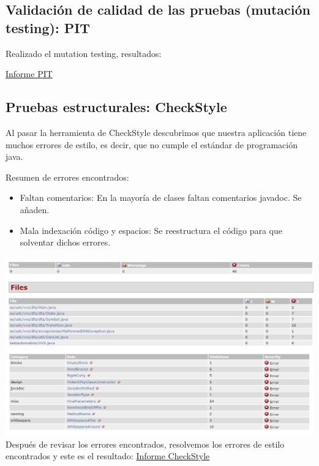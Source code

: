 \documentclass[DIV=calc,paper=a4,fontsize=11pt,onecolumn]{scrartcl} %
\begin{document}
	\subsection{Validación de calidad de las pruebas (mutación testing): PIT}
	Realizado el mutation testing, resultados:
	
	\href{Informes/pit-reports/index.html}{Informe PIT} \\
	
	\subsection{Pruebas estructurales: CheckStyle}
	Al pasar la herramienta de CheckStyle descubrimos que nuestra aplicación tiene muchos errores de estilo, es decir, que no cumple el estándar de programación java.
	
	Resumen de errores encontrados:
	\begin{itemize}
		\item Faltan comentarios: En la mayoría de clases faltan comentarios javadoc. Se añaden.
		\item Mala indexación código y espacios: Se reestructura el código para que solventar dichos errores.
	\end{itemize}
	\includegraphics[width=15cm]{Imagenes/erroresCheckStyle.png} \\
	\includegraphics[width=15cm]{Imagenes/checkStyleErrores.png} \\
	Después de revisar los errores encontrados, resolvemos los errores de estilo encontrados y este es el resultado:
	  \href{Informes/checkStyle-report/checkstyle.html}{Informe CheckStyle} \\
\end{document}
